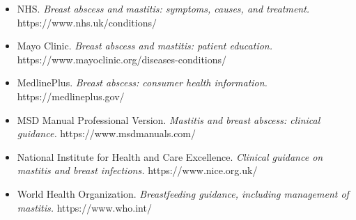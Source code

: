 \begin{itemize}
    \item NHS. \textit{Breast abscess and mastitis: symptoms, causes, and treatment.} https://www.nhs.uk/conditions/
    \item Mayo Clinic. \textit{Breast abscess and mastitis: patient education.} https://www.mayoclinic.org/diseases-conditions/
    \item MedlinePlus. \textit{Breast abscess: consumer health information.} https://medlineplus.gov/
    \item MSD Manual Professional Version. \textit{Mastitis and breast abscess: clinical guidance.} https://www.msdmanuals.com/
    \item National Institute for Health and Care Excellence. \textit{Clinical guidance on mastitis and breast infections.} https://www.nice.org.uk/
    \item World Health Organization. \textit{Breastfeeding guidance, including management of mastitis.} https://www.who.int/
\end{itemize}
